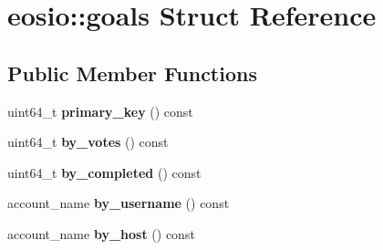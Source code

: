 \hypertarget{structeosio_1_1goals}{}\section{eosio\+:\+:goals Struct Reference}
\label{structeosio_1_1goals}
\subsection*{Public Member Functions}
\begin{DoxyCompactItemize}
\item 
\mbox{\label{structeosio_1_1goals_a655b9fba4d6b2aae4438594774084329}} 
uint64\+\_\+t {\bfseries primary\+\_\+key} () const
\item 
\mbox{\label{structeosio_1_1goals_a2c0113086cae3ad98940e3de87d58444}} 
uint64\+\_\+t {\bfseries by\+\_\+votes} () const
\item 
\mbox{\label{structeosio_1_1goals_a69b00d62a5cb920134fae59e339c1d00}} 
uint64\+\_\+t {\bfseries by\+\_\+completed} () const
\item 
\mbox{\label{structeosio_1_1goals_a03c257e1a973499fe794a911b22918e6}} 
account\+\_\+name {\bfseries by\+\_\+username} () const
\item 
\mbox{\label{structeosio_1_1goals_ad4ebe19cf0bfad2e21865530f58b8a3e}} 
account\+\_\+name {\bfseries by\+\_\+host} () const
\end{DoxyCompactItemize}
